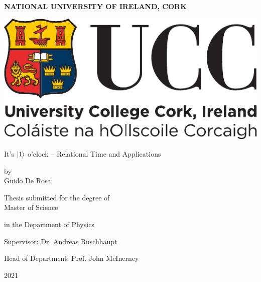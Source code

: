 \thispagestyle{empty}


\begin{centering}

\textbf{NATIONAL UNIVERSITY OF IRELAND, CORK}

\vspace{1cm}

\includegraphics[width=0.333\linewidth]{img/ucc_logo.pdf}

\vspace{0.5in}

\Huge

{It's ${\ket{1}}$ o'clock -- Relational Time and Applications}

\vspace{0.25in}

\Large
by
\\
Guido De Rosa

\vspace{0.5in}

\large

Thesis submitted for the degree of\\
Master of Science

in the Department of Physics

\vspace{0.25in}

Supervisor: Dr. Andreas Ruschhaupt

Head of Department: Prof. John McInerney

\vspace{2cm}

\Large
2021

\end{centering}

\clearpage

\thispagestyle{empty}

\cleardoublepage

\restoregeometry

